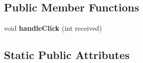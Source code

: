 \subsection*{Public Member Functions}
\begin{DoxyCompactItemize}
\item 
void {\bfseries handle\+Click} (int received)\hypertarget{classcom_1_1example_1_1android_1_1wearable_1_1wcldemo_1_1CognitiveColorShapeTestActivity_a9f508457a901f8d71bc2e9a1da50a290}{}\label{classcom_1_1example_1_1android_1_1wearable_1_1wcldemo_1_1CognitiveColorShapeTestActivity_a9f508457a901f8d71bc2e9a1da50a290}

\end{DoxyCompactItemize}
\subsection*{Static Public Attributes}
